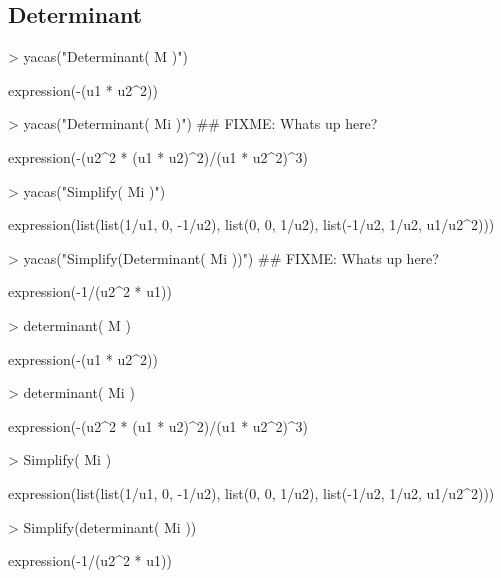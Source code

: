 \documentclass[10pt]{article}
\begin{document}
\subsection{Determinant}

\begin{Schunk}
\begin{Sinput}
> yacas("Determinant( M )")
\end{Sinput}
\begin{Soutput}
expression(-(u1 * u2^2))
\end{Soutput}
\begin{Sinput}
> yacas("Determinant( Mi )") ## FIXME: Whats up here?
\end{Sinput}
\begin{Soutput}
expression(-(u2^2 * (u1 * u2)^2)/(u1 * u2^2)^3)
\end{Soutput}
\begin{Sinput}
> yacas("Simplify( Mi )")
\end{Sinput}
\begin{Soutput}
expression(list(list(1/u1, 0, -1/u2), list(0, 0, 1/u2), list(-1/u2, 
    1/u2, u1/u2^2)))
\end{Soutput}
\begin{Sinput}
> yacas("Simplify(Determinant( Mi ))") ## FIXME: Whats up here?
\end{Sinput}
\begin{Soutput}
expression(-1/(u2^2 * u1))
\end{Soutput}
\end{Schunk}


\begin{Schunk}
\begin{Sinput}
> determinant( M )
\end{Sinput}
\begin{Soutput}
expression(-(u1 * u2^2))
\end{Soutput}
\begin{Sinput}
> determinant( Mi )
\end{Sinput}
\begin{Soutput}
expression(-(u2^2 * (u1 * u2)^2)/(u1 * u2^2)^3)
\end{Soutput}
\begin{Sinput}
> Simplify( Mi )
\end{Sinput}
\begin{Soutput}
expression(list(list(1/u1, 0, -1/u2), list(0, 0, 1/u2), list(-1/u2, 
    1/u2, u1/u2^2)))
\end{Soutput}
\begin{Sinput}
> Simplify(determinant( Mi ))
\end{Sinput}
\begin{Soutput}
expression(-1/(u2^2 * u1))
\end{Soutput}
\end{Schunk}
\end{document}
